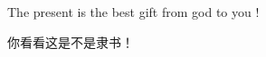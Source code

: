 \documentclass[12pt,a4paper]{ctexart}
\begin{document}
The present is the best gift from god to you !

你看看这是不是隶书！
\end{document}
